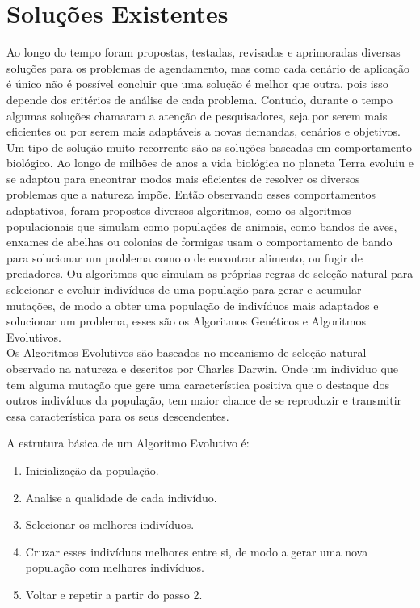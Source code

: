 \section{Soluções Existentes}
Ao longo do tempo foram propostas, testadas, revisadas e aprimoradas diversas soluções para os problemas de agendamento, mas como cada cenário de aplicação é único não é possível concluir que uma solução é melhor que outra, pois isso depende dos critérios de análise de cada problema. Contudo, durante o tempo algumas soluções chamaram a atenção de pesquisadores, seja por serem mais eficientes ou por serem mais adaptáveis a novas demandas, cenários e objetivos.\\
\indent Um tipo de solução muito recorrente são as soluções baseadas em comportamento biológico. 
%
Ao longo de milhões de anos a vida biológica no planeta Terra evoluiu e se adaptou para encontrar modos mais eficientes de resolver os diversos problemas que a natureza impõe. 
Então observando esses comportamentos adaptativos, foram propostos diversos algoritmos, 
como os algoritmos populacionais que simulam como populações de animais, como bandos de aves, enxames de abelhas ou colonias de formigas usam o comportamento de bando para solucionar um problema como o de encontrar alimento, ou fugir de predadores. 
Ou algoritmos que simulam as próprias regras de seleção natural para selecionar e evoluir indivíduos de uma população para gerar e acumular mutações, de modo a obter uma população de indivíduos mais adaptados e solucionar um problema, esses são os Algoritmos Genéticos e Algoritmos Evolutivos.\\
\indent Os Algoritmos Evolutivos são baseados no mecanismo de seleção natural observado na natureza e descritos por Charles Darwin. Onde um individuo que tem alguma mutação que gere uma característica positiva que o destaque dos outros indivíduos da população, tem maior chance de se reproduzir e transmitir essa característica para os seus descendentes.


A estrutura básica de um Algoritmo Evolutivo é:
\begin{enumerate}
    \item Inicialização da população.
    \item Analise a qualidade de cada indivíduo.
    \item Selecionar os melhores indivíduos.
    \item Cruzar esses indivíduos melhores entre si, de modo a gerar uma nova população com melhores indivíduos.
    \item Voltar e repetir a partir do passo 2.
\end{enumerate}


